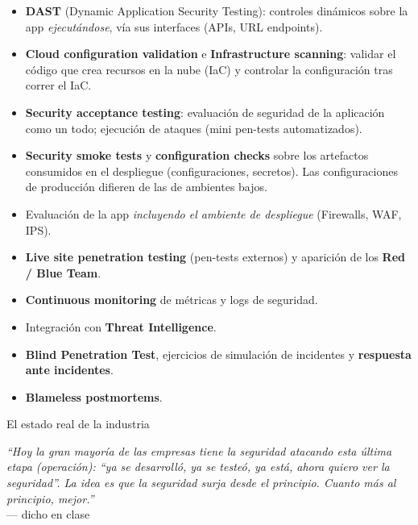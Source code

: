 \documentclass[11pt,a4paper]{article}
\newcommand{\prof}[1]{\par\medskip\noindent\textit{``#1''}\\[-2pt]\hspace*{1em}%
  {\footnotesize\textcolor{black!60}{--- dicho en clase}}\par\medskip\noindent}
\begin{document}
\begin{description}[leftmargin=0pt,labelsep=0.4em,style=nextline,itemsep=4pt]
\begin{itemize}[leftmargin=1.4em,itemsep=0pt,topsep=2pt]
      \item \textbf{DAST} (Dynamic Application Security Testing): controles dinámicos sobre la
            app \emph{ejecutándose}, vía sus interfaces (APIs, URL endpoints).
      \item \textbf{Cloud configuration validation} e \textbf{Infrastructure scanning}: validar
            el código que crea recursos en la nube (IaC) y controlar la configuración tras
            correr el IaC.
      \item \textbf{Security acceptance testing}: evaluación de seguridad de la aplicación como
            un todo; ejecución de ataques (mini pen-tests automatizados).
    \end{itemize}
  \item[4. Go to Production (On Deployment)]
    \begin{itemize}[leftmargin=1.4em,itemsep=0pt,topsep=2pt]
      \item \textbf{Security smoke tests} y \textbf{configuration checks} sobre los artefactos
            consumidos en el despliegue (configuraciones, secretos). Las configuraciones de
            producción difieren de las de ambientes bajos.
      \item Evaluación de la app \emph{incluyendo el ambiente de despliegue} (Firewalls, WAF,
            IPS).
      \item \textbf{Live site penetration testing} (pen-tests externos) y aparición de los
            \textbf{Red / Blue Team}.
    \end{itemize}
  \item[5. Operate (On Operation)]
    \begin{itemize}[leftmargin=1.4em,itemsep=0pt,topsep=2pt]
      \item \textbf{Continuous monitoring} de métricas y logs de seguridad.
      \item Integración con \textbf{Threat Intelligence}.
      \item \textbf{Blind Penetration Test}, ejercicios de simulación de incidentes y
            \textbf{respuesta ante incidentes}.
      \item \textbf{Blameless postmortems}.
    \end{itemize}
\end{description}

\begin{anecbox}{El estado real de la industria}
\prof{Hoy la gran mayoría de las empresas tiene la seguridad atacando esta última etapa
(operación): ``ya se desarrolló, ya se testeó, ya está, ahora quiero ver la seguridad''. La idea
es que la seguridad surja desde el principio. Cuanto más al principio, mejor.}
\end{anecbox}
\end{document}

